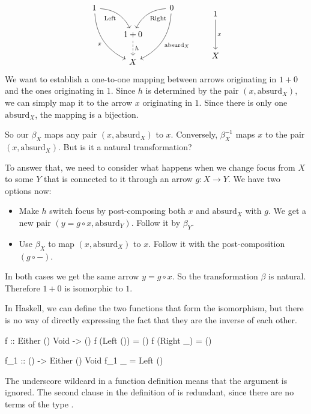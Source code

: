 \documentclass[DaoFP]{subfiles}
\begin{document}
\[
 \begin{tikzcd}
 1
 \arrow[dr,  bend left, "\text{Left}"']
 \arrow[ddr, bend right, "x"']
 && 0
 \arrow[dl, bend right, "\text{Right}"]
 \arrow[ddl, bend left, "\text{absurd}_X"]
 \\
&1 + 0
\arrow[d, dashed, "h"]
\\
& X
 \end{tikzcd}
 \qquad
 \begin{tikzcd}
 1
 \arrow[dd, "x"]
 \\
 \\
 X
 \end{tikzcd}
\]
We want to establish a one-to-one mapping between arrows originating in $1+0$ and the ones originating in $1$. Since $h$ is determined by the pair $(x, \text{absurd}_X)$, we can simply map it to the arrow $x$ originating in $1$. Since there is only one $\text{absurd}_X$, the mapping is a bijection. 

So our $\beta_X$ maps any pair $(x, \text{absurd}_X)$ to $x$. Conversely, $\beta^{-1}_X$ maps $x$ to the pair $(x, \text{absurd}_X)$. But is it a natural transformation? 

To answer that, we need to consider what happens when we change focus from $X$ to some $Y$ that is connected to it through an arrow $g \colon X \to Y$. We have two options now:
\begin{itemize}
\item Make $h$ switch focus by post-composing both $x$ and $\text{absurd}_X$ with $g$. We get a new pair $(y = g \circ x, \text{absurd}_Y)$. Follow it by $\beta_Y$.
\item Use $\beta_X$ to map $(x, \text{absurd}_X)$ to $x$. Follow it with the post-composition $(g \circ -)$. 
\end{itemize}
In both cases we get the same arrow $y = g \circ x$. So the transformation $\beta$ is natural. Therefore $1 + 0$ is isomorphic to $1$.

In Haskell, we can define the two functions that form the isomorphism, but there is no way of directly expressing the fact that they are the inverse of each other.
\begin{haskell}
f :: Either () Void -> ()
f (Left ()) = ()
f (Right _) = ()

f_1 :: () -> Either () Void
f_1 _ = Left ()
\end{haskell}
The underscore wildcard in a function definition means that the argument is ignored. The second clause in the definition of  is redundant, since there are no terms of the type . 
\end{document}
